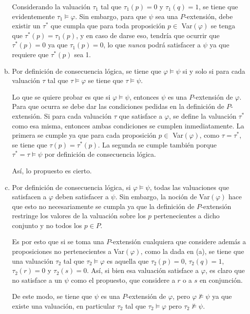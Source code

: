 \documentclass[letterpaper,10pt]{article}
\begin{document}
\begin{enumerate}[a)]
    Considerando la valuación $\tau_1$ tal que $\tau_1(p) = 0$ y $\tau_1(q) = 1$, se tiene que evidentemente $\tau_1 \models \varphi$. Sin embargo, para que $\psi$ sea una $P$-extensión, debe existir un $\tau^*$ que cumpla que para toda proposición $p \in$ Var$(\varphi)$ se tenga que $\tau^*(p)=\tau_1(p)$, y en caso de darse eso, tendría que ocurrir que $\tau^*(p) = 0$ ya que $\tau_1(p) = 0$, lo que \textit{nunca} podrá satisfacer a $\psi$ ya que requiere que $\tau^*(p)$ sea 1.

    \item Por definición de consecuencia lógica, se tiene que $\varphi \models \psi$ si y solo si para cada valuación $\tau$ tal que $\tau \models \varphi$ se tiene que $\tau \models \psi$.

    Lo que se quiere probar es que si $\varphi \models \psi$, entonces $\psi$ es una $P$-extensión de $\varphi$. Para que ocurra se debe dar las condiciones pedidas en la definición de $P$-extensión. Si para cada valuación $\tau$ que satisface a $\varphi$, se define la valuación $\tau^*$ como esa misma, entonces ambas condiciones se cumplen inmediatamente. La primera se cumple ya que para cada proposición $p \in$ Var$(\varphi)$, como $\tau = \tau^*$, se tiene que $\tau(p) = \tau^*(p)$. La segunda se cumple también porque $\tau^*=\tau \models \psi$ por definición de consecuencia lógica.

    Así, lo propuesto es cierto.

    \item Por definición de consecuencia lógica, si $\varphi \models \psi$, todas las valuaciones que satisfacen a $\varphi$ deben satisfacer a $\psi$. Sin embargo, la noción de Var$(\varphi)$ hace que esto no necesariamente se cumpla ya que la definición de $P$-extensión restringe los valores de la valuación sobre los $p$ pertenecientes a dicho conjunto y no todos los $p\in P$.

    Es por esto que si se toma una $P$-extensión cualquiera que considere además a proposiciones no pertenecientes a Var$(\varphi)$, como la dada en (a), se tiene que una valuación $\tau_2$ tal que $\tau_2 \models \varphi$ es aquella que $\tau_2(p) = 0$, $\tau_2(q) = 1$, $\tau_2(r) = 0$ y $\tau_2(s) = 0$. Así, si bien esa valuación satisface a $\varphi$, es claro que no satisface a un $\psi$ como el propuesto, que considere a $r$ o a $s$ en conjunción.

    De este modo, se tiene que $\psi$ es una $P$-extensión de $\varphi$, pero $\varphi \not\models \psi$ ya que existe una valuación, en particular $\tau_2$ tal que $\tau_2 \models \varphi$ pero $\tau_2 \not\models \psi$.


\end{enumerate}
\end{document}
